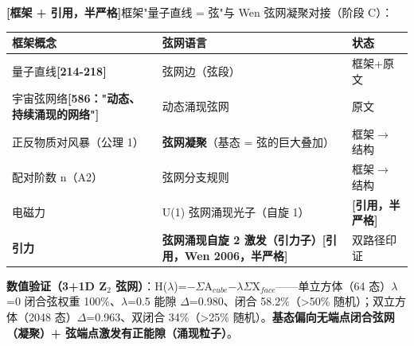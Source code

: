 \documentclass[12pt]{article}
\newcommand{\mtag}[1]{\textbf{[#1]}}
\newcommand{\down}[1]{\ensuremath{_{#1}}}
\begin{document}
\mtag{框架 + 引用，半严格}框架"量子直线 = 弦"与 Wen 弦网凝聚对接（阶段 C）：

\begin{table}[htbp]
\centering
\small
\begin{tabularx}{\textwidth}{@{}lXX@{}}
\toprule
框架概念 & 弦网语言 & 状态 \\
\midrule
量子直线\mtag{214-218} & 弦网边（弦段） & 框架+原文 \\
宇宙弦网络\mtag{586："动态、持续涌现的网络"} & 动态涌现弦网 & 原文 \\
正反物质对风暴（公理 1） & \textbf{弦网凝聚}（基态 = 弦的巨大叠加） & 框架\ensuremath{\to}结构 \\
配对阶数 n（A2） & 弦网分支规则 & 框架\ensuremath{\to}结构 \\
电磁力 & U(1) 弦网涌现光子（自旋 1） & \mtag{引用，半严格} \\
\textbf{引力} & \textbf{弦网涌现自旋 2 激发（引力子）}\mtag{引用，Wen 2006，半严格} & 双路径印证 \\
\bottomrule
\end{tabularx}
\end{table}

\textbf{数值验证（3+1D Z\down{2} 弦网）}：H(\ensuremath{\lambda})=\ensuremath{-}\ensuremath{\Sigma}A\down{cube}\ensuremath{-}\ensuremath{\lambda}\ensuremath{\Sigma}X\down{face}------单立方体（64 态）\ensuremath{\lambda}=0 闭合弦权重 100\%、\ensuremath{\lambda}=0.5 能隙 \ensuremath{\Delta}=0.980、闭合 58.2\%（>50\% 随机）；双立方体（2048 态）\ensuremath{\Delta}=0.963、双闭合 34\%（>25\% 随机）。\textbf{基态偏向无端点闭合弦网（凝聚）+ 弦端点激发有正能隙（涌现粒子）}。
\end{document}
